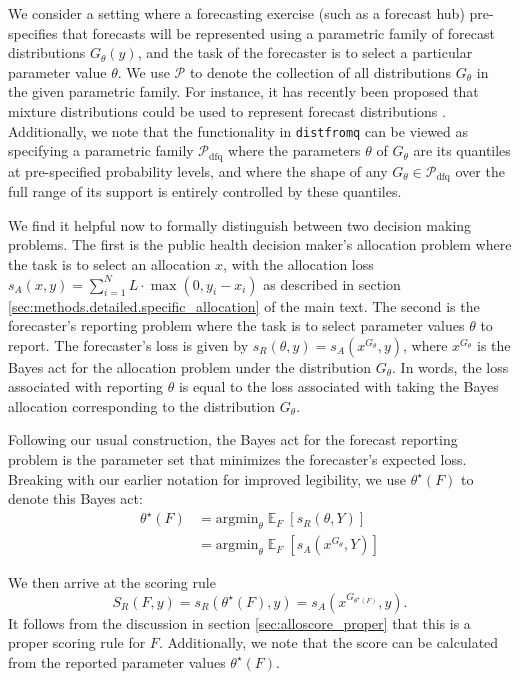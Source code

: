 \documentclass{article}\usepackage[]{graphicx}\usepackage[]{xcolor}
\DeclareMathOperator{\Ex}{\mathbb{E}}
\begin{document}
We consider a setting where a forecasting exercise (such as a forecast hub) pre-specifies that forecasts will be represented using a parametric family of forecast distributions $G_\theta(y)$, and the task of the forecaster is to select a particular parameter value $\theta$. We use $\mathcal{P}$ to denote the collection of all distributions $G_\theta$ in the given parametric family. For instance, it has recently been proposed that mixture distributions could be used to represent forecast distributions \cite{wadsworth2023mixture}. Additionally, we note that the functionality in \verb`distfromq` can be viewed as specifying a parametric family $\mathcal{P}_{\mathrm{dfq}}$ where the parameters $\theta$ of $G_\theta$
are its quantiles at pre-specified probability levels, and where the shape of any $G_\theta \in \mathcal{P}_{\mathrm{dfq}}$ over the full range of its support is entirely controlled by these quantiles.

We find it helpful now to formally distinguish between two decision making problems. The first is the public health decision maker's allocation problem where the task is to select an allocation $x$, with the allocation loss $s_A(x, y) = \sum_{i=1}^N L \cdot \max(0, y_i - x_i)$ as described in section \ref{sec:methods.detailed.specific_allocation} of the main text.
The second is the forecaster's reporting problem where the task is to select parameter values $\theta$ to report. The forecaster's loss is given by $s_R(\theta, y) = s_A(x^{G_\theta}, y)$, where $x^{G_\theta}$ is the Bayes act for the allocation problem under the distribution $G_\theta$. In words, the loss associated with reporting $\theta$ is equal to the loss associated with taking the Bayes allocation corresponding to the distribution $G_\theta$.

Following our usual construction, the Bayes act for the forecast reporting problem is the parameter set that minimizes the forecaster's expected loss. Breaking with our earlier notation for improved legibility, we use $\theta^\star(F)$ to denote this Bayes act:
\begin{align*}
\theta^\star(F) &= \text{argmin}_\theta \Ex_F [s_R(\theta, Y)] \\
&= \text{argmin}_\theta \Ex_F [s_A(x^{G_\theta}, Y)]
\end{align*}

We then arrive at the scoring rule
$$S_R(F, y) = s_R(\theta^\star(F), y) = s_A(x^{G_{\theta^\star(F)}}, y).$$
It follows from the discussion in section \ref{sec:alloscore_proper} that this is a proper scoring rule for $F$. Additionally, we note that the score can be calculated from the reported parameter values $\theta^\star(F)$.
\end{document}
